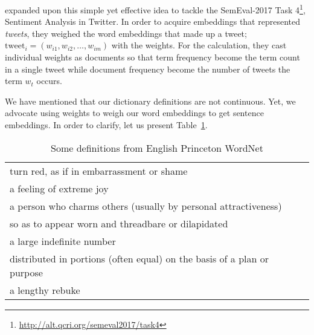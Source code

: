 \textcite{edilson_a._correa_nilc-usp_2017} expanded upon this simple yet effective idea to tackle the SemEval-2017 Task 4\footnote{\url{http://alt.qcri.org/semeval2017/task4}}, Sentiment Analysis in Twitter.
In order to acquire embeddings that represented \emph{tweets}, they weighed the word embeddings that made up a tweet; $\text{tweet}_i = (w_{i1}, w_{i2}, \dots, w_{im})$ with the \tfidf{} weights.
For the \tfidf{} calculation, they cast individual weights as documents so that term frequency become the term count in a single tweet while document frequency become the number of tweets the term $w_t$ occurs.

We have mentioned that our dictionary definitions are not continuous.
Yet, we advocate using \tfidf{} weights to weigh our word embeddings to get sentence embeddings.
In order to clarify, let us present Table~\ref{tab:en_it_examples}.

\noindent{}%

\begin{table}
    \centering
    \caption{Some definitions from English Princeton WordNet}%
    \label{tab:en_it_examples}
    \begin{tabular}{l}
        \toprule
        turn red, as if in embarrassment or shame \\
        a feeling of extreme joy \\
        a person who charms others (usually by personal attractiveness) \\
        so as to appear worn and threadbare or dilapidated \\
        a large indefinite number \\
        distributed in portions (often equal) on the basis of a plan or purpose \\
        a lengthy rebuke \\
        \bottomrule
    \end{tabular}
\end{table}


